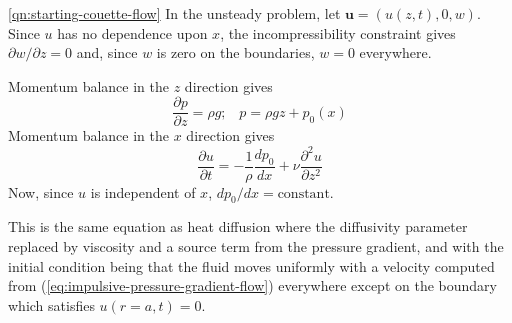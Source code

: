 \documentclass[10pt]{report}
\begin{document}
\begin{answer5}
\begin{questionnumber}{\ref{qn:starting-couette-flow}}
In the unsteady problem, let ${\bm u} = (u(z,t), 0, w )$. Since $u$ has no dependence upon $x$, the incompressibility constraint gives $\partial w / \partial z = 0$ and, since $w$ is zero on the boundaries, $w=0$ everywhere.

Momentum balance in the $z$ direction gives
\[
	\frac{\partial p}{\partial z} = \rho g; \;\;\; p = \rho g z + p_{0}(x)
\]
Momentum balance in the $x$ direction gives
\[
	\frac{\partial u}{\partial t} = -\frac{1}{\rho} \frac{dp_{0}}{dx} +
		                       \nu \frac{\partial^{2}u}{\partial z^{2}}
\]
Now, since $u$ is independent of $x$, $dp_{0}/dx = \text{constant}$.

This is the same equation as heat diffusion where the diffusivity parameter replaced by
viscosity and a source term from the pressure gradient, and
with the initial condition being that the fluid moves uniformly with
a velocity computed from (\ref{eq:impulsive-pressure-gradient-flow})
everywhere except on the boundary which satisfies $u(r=a,t)=0$.
\end{questionnumber}

\end{answer5}
\end{document}
